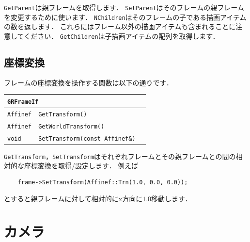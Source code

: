 \texttt{GetParent}\KLUDGE は親フレームを取得します．
\texttt{SetParent}\KLUDGE はそのフレームの親フレームを変更するために使います．
\texttt{NChildren}\KLUDGE はそのフレームの子である描画アイテムの数を返します．
\KLUDGE これらにはフレーム以外の描画アイテムも含まれることに注意してください．
\texttt{GetChildren}\KLUDGE は子描画アイテムの配列を取得します．


\subsection*{\KLUDGE 座標変換}

\KLUDGE フレームの座標変換を操作する関数は以下の通りです．

\begin{center}
\begin{tabular}{p{.15\hsize}p{.45\hsize}p{.3\hsize}}
\multicolumn{3}{l}{\texttt{GRFrameIf}}							\\ \midrule
\texttt{Affinef} & \texttt{GetTransform()}					& 	\\
\texttt{Affinef} & \texttt{GetWorldTransform()}				& 	\\
\texttt{void}	 & \texttt{SetTransform(const Affinef\&)}	& 	\\
\end{tabular}
\end{center}

\texttt{GetTransform}\KLUDGE ，\texttt{SetTransform}\KLUDGE はそれぞれフレームとその親フレームとの間の相対的な座標変換を取得/\KLUDGE 設定します．
\KLUDGE 例えば
\begin{verbatim}
    frame->SetTransform(Affinef::Trn(1.0, 0.0, 0.0));
\end{verbatim}
\KLUDGE とすると親フレームに対して相対的にx\KLUDGE 方向に$1.0$\KLUDGE 移動します．

\section{\KLUDGE カメラ}

